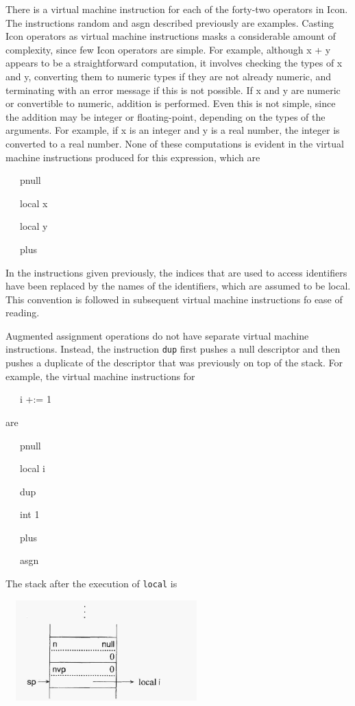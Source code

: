 There is a virtual machine instruction for each of the forty-two
operators in Icon. The instructions random and asgn described
previously are examples. Casting Icon operators as virtual machine
instructions masks a considerable amount of complexity, since few Icon
operators are simple. For example, although x + y appears to be a
straightforward computation, it involves checking the types of x and
y, converting them to numeric types if they are not already numeric,
and terminating with an error message if this is not possible. If x
and y are numeric or convertible to numeric, addition is
performed. Even this is not simple, since the addition may be integer
or floating-point, depending on the types of the arguments. For
example, if x is an integer and y is a real number, the integer is
converted to a real number. None of these computations is evident in
the virtual machine instructions produced for this expression, which
are

{\ttfamily
\ \ \ pnull}

{\ttfamily
\ \ \ local x}

{\ttfamily
\ \ \ local y}

{\ttfamily
\ \ \ plus}


In the instructions given previously, the indices that are used to
access identifiers have been replaced by the names of the identifiers,
which are assumed to be local. This convention is followed in
subsequent virtual machine instructions fo ease of reading.

Augmented assignment operations do not have separate virtual machine
instructions. Instead, the instruction \texttt{dup} first pushes a
null descriptor and then pushes a duplicate of the descriptor that was
previously on top of the stack.  For example, the virtual machine
instructions for

{\ttfamily\mdseries
\ \ \ i +:= 1}

are

{\ttfamily\mdseries
\ \ \ pnull}

{\ttfamily\mdseries
\ \ \ local i}

{\ttfamily\mdseries
\ \ \ dup}

{\ttfamily\mdseries
\ \ \ int 1}

{\ttfamily\mdseries
\ \ \ plus}

{\ttfamily\mdseries
\ \ \ asgn}


The stack after the execution of \texttt{local} is


\ \  \includegraphics[width=2.778in,height=1.5189in]{ib-img/ib-img055.jpg} 


